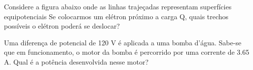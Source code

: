\documentclass[12pt, addpoints]{exam}
\begin{document}
\begin{questions}
\begin{multicols*}{2}
\begin{oneparchoices}
\end{oneparchoices}
\question[20] Considere a figura abaixo onde as linhas trajeçadas representam superfícies equipotenciais Se colocarmos um elétron próximo a carga Q, quais trechos possíveis o elétron poderá se deslocar?
        
        \begin{center}
            \begin{minipage}[c]{0.5\linewidth}
            \end{minipage}
        \end{center}
        
        

\begin{oneparchoices}
\end{oneparchoices}
\question[20] Uma diferença de potencial de 120 V é aplicada a uma bomba d’água. Sabe-se que em funcionamento, o motor da bomba é percorrido por uma corrente de    3.65 A. Qual é a potência desenvolvida nesse motor?


\end{multicols*}
\end{questions}
\end{document}
